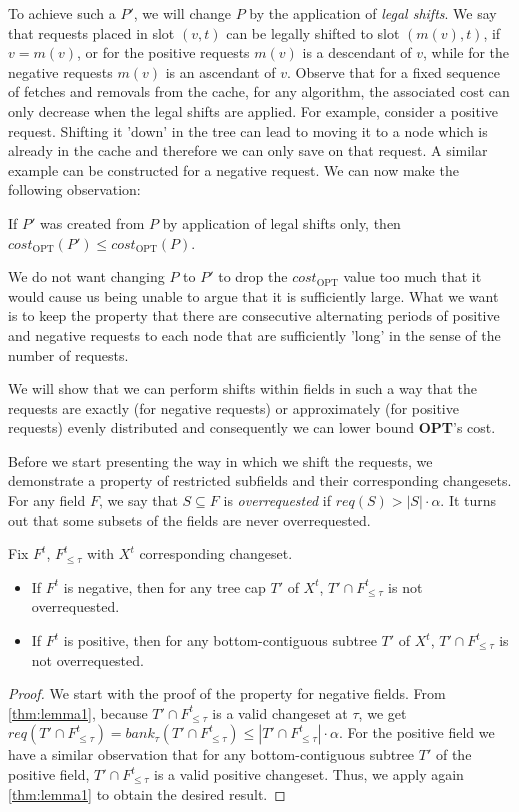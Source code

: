 To achieve such a $P'$, we will change $P$ by the application of \textit{legal
shifts}.  We say that requests placed in slot $(v, t)$ can be legally shifted
to slot $(m(v), t)$, if $v = m(v)$, or for the positive requests $m(v)$ is a 
descendant of $v$, while for the negative requests $m(v)$ is an ascendant of $v$.
Observe that for a fixed sequence of fetches and removals from the cache, for any
algorithm, the associated cost can only decrease when the legal shifts are
applied. For example, consider a positive request. Shifting it 'down' in the tree
can lead to moving it to a node which is already in the cache and therefore we
can only save on that request. A similar example can be constructed for a negative
request. We can now make the following observation: \begin{observe} If $P'$ was
created from $P$ by application of legal shifts only, then
$cost_{\mathrm{OPT}}(P') \leq cost_{\mathrm{OPT}}(P)$.  \end{observe}

We do not want changing $P$ to $P'$ to drop the $cost_{\mathrm{OPT}}$ value too
much that it would cause us being unable to argue that it is sufficiently large.
What we want is to keep the property that there are consecutive alternating
periods of positive and negative requests to each node that are sufficiently
'long' in the sense of the number of requests. 

We will show that we can perform shifts within fields in such a way that the
requests are exactly (for negative requests) or approximately (for positive
requests) evenly distributed and consequently we can lower bound \textbf{OPT}'s
cost.

Before we start presenting the way in which we shift the requests, we
demonstrate a property of restricted subfields and their corresponding
changesets. For any field $F$, we say that $S \subseteq F$ is
\textit{overrequested} if $req(S) > |S| \cdot \alpha$. It turns out that some
subsets of the fields are never overrequested.  \begin{lemma} Fix $F^t$,
$F^t_{\leq \tau}$ with $X^t$ corresponding changeset.  \begin{itemize} \item If
$F^t$ is negative, then for any tree cap $T'$ of $X^t$, $T' \cap F^t_{\leq
\tau}$ is not overrequested.  \item If $F^t$ is positive, then for any
bottom-contiguous subtree $T'$ of $X^t$, $T'\cap F^t_{\leq \tau}$ is not
overrequested.  \end{itemize} \label{thm:not_over_requested} \end{lemma}
\begin{proof} We start with the proof of the property for negative fields. From
\ref{thm:lemma1}, because $T' \cap  F^t_{\leq \tau}$ is a valid changeset at
$\tau$, we get $req(T' \cap  F^t_{\leq \tau}) = bank_{\tau}(T' \cap F^t_{\leq
\tau}) \leq |T' \cap F^t_{\leq \tau}| \cdot \alpha$. For the positive field we
have a similar observation that for any bottom-contiguous subtree $T'$ of the
positive field, $T'\cap F^t_{\leq \tau}$ is a valid positive changeset. Thus, we
apply again \ref{thm:lemma1} to obtain the desired result.  \end{proof}

